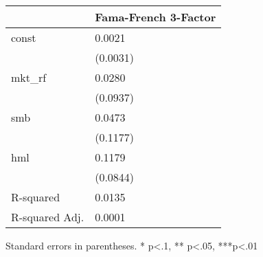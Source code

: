 \begin{table}
\caption{}
\label{}
\begin{center}
\begin{tabular}{ll}
\hline
               & Fama-French 3-Factor  \\
\hline
const          & 0.0021                \\
               & (0.0031)              \\
mkt\_rf        & 0.0280                \\
               & (0.0937)              \\
smb            & 0.0473                \\
               & (0.1177)              \\
hml            & 0.1179                \\
               & (0.0844)              \\
R-squared      & 0.0135                \\
R-squared Adj. & 0.0001                \\
\hline
\end{tabular}
\end{center}
\end{table}
\bigskip
Standard errors in parentheses. \newline 
* p<.1, ** p<.05, ***p<.01